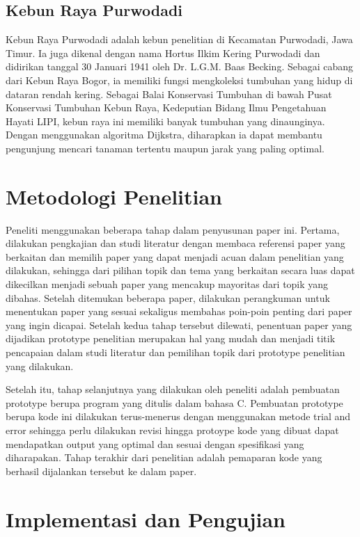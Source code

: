 \documentclass[conference]{IEEEtran}
\begin{document}
	\subsection{Kebun Raya Purwodadi}
Kebun Raya Purwodadi adalah kebun penelitian di Kecamatan Purwodadi, Jawa Timur. Ia juga dikenal dengan nama
Hortus Ilkim Kering Purwodadi dan didirikan tanggal 30 Januari 1941 oleh Dr. L.G.M. Baas Becking. Sebagai cabang dari
Kebun Raya Bogor, ia memiliki fungsi mengkoleksi tumbuhan
yang hidup di dataran rendah kering. Sebagai Balai Konservasi
Tumbuhan di bawah Pusat Konservasi Tumbuhan Kebun Raya,
Kedeputian Bidang Ilmu Pengetahuan Hayati LIPI, kebun raya
ini memiliki banyak tumbuhan yang dinaunginya. Dengan
menggunakan algoritma Dijkstra, diharapkan ia dapat membantu pengunjung mencari tanaman tertentu maupun jarak
yang paling optimal.

	\section{Metodologi Penelitian}
Peneliti menggunakan beberapa tahap dalam penyusunan
paper ini. Pertama, dilakukan pengkajian dan studi literatur
dengan membaca referensi paper yang berkaitan dan memilih
paper yang dapat menjadi acuan dalam penelitian yang dilakukan, sehingga dari pilihan topik dan tema yang berkaitan
secara luas dapat dikecilkan menjadi sebuah paper yang mencakup mayoritas dari topik yang dibahas. Setelah ditemukan
beberapa paper, dilakukan perangkuman untuk menentukan
paper yang sesuai sekaligus membahas poin-poin penting
dari paper yang ingin dicapai. Setelah kedua tahap tersebut
dilewati, penentuan paper yang dijadikan prototype penelitian
merupakan hal yang mudah dan menjadi titik pencapaian
dalam studi literatur dan pemilihan topik dari prototype penelitian yang dilakukan.

Setelah itu, tahap selanjutnya yang dilakukan oleh peneliti
adalah pembuatan prototype berupa program yang ditulis
dalam bahasa C. Pembuatan prototype berupa kode ini dilakukan terus-menerus dengan menggunakan metode trial and
error sehingga perlu dilakukan revisi hingga protoype kode
yang dibuat dapat mendapatkan output yang optimal dan
sesuai dengan spesifikasi yang diharapakan. Tahap terakhir
dari penelitian adalah pemaparan kode yang berhasil dijalankan tersebut ke dalam paper.

	\section{Implementasi dan Pengujian}
\end{document}
